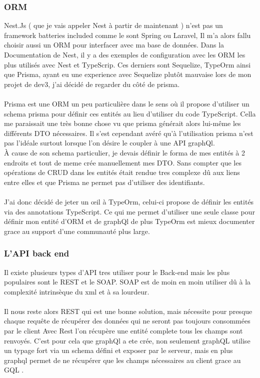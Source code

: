 \subsubsection{ORM}
Nest.Js ( que je vais appeler Nest à partir de maintenant ) n'est pas un framework batteries included comme le sont Spring ou Laravel,
Il m'a alors fallu choisir aussi un ORM pour interfacer avec ma base de données.
Dans la Documentation de Nest, il y a des exemples de configuration avec les ORM les plus utilisés avec Nest et TypeScrip.
Ces derniers sont Sequelize, TypeOrm ainsi que Prisma,
ayant eu une experience avec Sequelize plutôt mauvaise lors de mon projet de dev3, j'ai décidé de regarder du côté de prisma.\\\\
Prisma est une ORM un peu particulière dans le sens où il propose d'utiliser un schema prisma pour définir ces entités au lieu d'utiliser du code TypeScript.
Cella me paraissait une très bonne chose vu que prisma générait alors lui-même les différents DTO nécessaires.
Il s'est cependant avéré qu'à l'utilisation prisma n'est pas l'idéale surtout lorsque l'on désire le coupler à une API graphQl.\\
À cause de son schema particulier, je devais définir le forma de mes entités à 2 endroits et tout de meme crée manuellement mes DTO\@.
Sans compter que les opérations de CRUD dans les entités était rendue tres complexe dû aux liens entre elles et que Prisma ne permet pas d'utiliser des identifiants.\\\\
J'ai donc décidé de jeter un œil à TypeOrm, celui-ci propose de définir les entités via des annotations TypeScript.
Ce qui me permet d'utiliser une seule classe pour définir mon entité d'ORM et de graphQl de plus TypeOrm est mieux
documenter grace au support d'une communauté plus large.


\subsubsection{L'API back end}
Il existe plusieurs types d'API tres utiliser pour le Back-end mais les plus populaires sont le REST et le SOAP\@.
SOAP est de moin en moin utiliser dû à la complexité intrinsèque du xml et à sa lourdeur.\\\\
Il nous reste alors REST qui est une bonne solution, mais nécessite pour presque chaque requête de récupérer des données qui ne seront pas toujours consommées par le client
Avec Rest l'on récupère une entité complete tous les champs sont renvoyés.
C'est pour cela que graphQl a ete crée, non seulement graphQL utilise un typage fort via un schema défini et exposer par le serveur,
mais en plus graphql permet de ne récupérer que les champs nécessaires au client grace au GQL .

